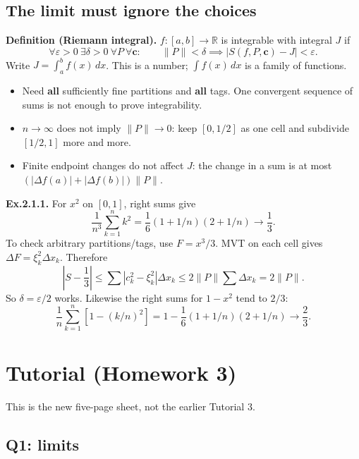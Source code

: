 \documentclass[11pt,letterpaper]{article}
\newcommand{\tightlist}{\setlength{\itemsep}{0pt}\setlength{\parskip}{0pt}}
\begin{document}
\subsection{The limit must ignore the
choices}\label{the-limit-must-ignore-the-choices}

\textbf{Definition (Riemann integral).} \(f:[a,b]\to\mathbb R\) is
integrable with integral \(J\) if \[
\forall\varepsilon>0\ \exists\delta>0\ \forall P\ \forall\mathbf c:
\qquad \|P\|<\delta\implies|S(f,P,\mathbf c)-J|<\varepsilon.
\] Write \(J=\int_a^b f(x)\,dx\). This is a number; \(\int f(x)\,dx\) is
a family of functions.

\begin{itemize}
\tightlist
\item
  Need \textbf{all} sufficiently fine partitions and \textbf{all} tags.
  One convergent sequence of sums is not enough to prove integrability.
\item
  \(n\to\infty\) does not imply \(\|P\|\to0\): keep \([0,1/2]\) as one
  cell and subdivide \([1/2,1]\) more and more.
\item
  Finite endpoint changes do not affect \(J\): the change in a sum is at
  most \((|\Delta f(a)|+|\Delta f(b)|)\|P\|\).
\end{itemize}

\textbf{Ex.2.1.1.} For \(x^2\) on \([0,1]\), right sums give \[
\frac1{n^3}\sum_{k=1}^n k^2
=\frac16(1+1/n)(2+1/n)\to\frac13.
\] To check arbitrary partitions/tags, use \(F=x^3/3\). MVT on each cell
gives \(\Delta F=\xi_k^2\Delta x_k\). Therefore \[
\left|S-\frac13\right|
\le\sum|c_k^2-\xi_k^2|\Delta x_k
\le2\|P\|\sum\Delta x_k=2\|P\|.
\] So \(\delta=\varepsilon/2\) works. Likewise the right sums for
\(1-x^2\) tend to \(2/3\): \[
\frac1n\sum_{k=1}^n[1-(k/n)^2]
=1-\frac16(1+1/n)(2+1/n)\to\frac23.
\]

\section{Tutorial (Homework 3)}\label{tutorial-homework-3}

This is the new five-page sheet, not the earlier Tutorial 3.

\subsection{Q1: limits}\label{q1-limits}
\end{document}
